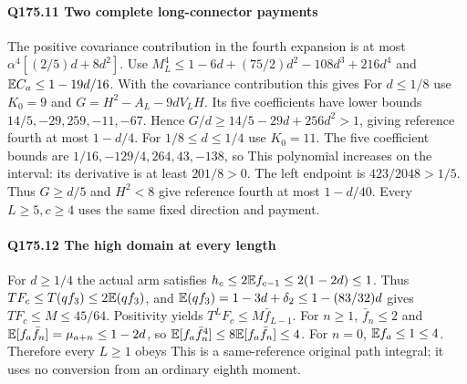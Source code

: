 \paragraph{Q175.11 Two complete long-connector payments}\label{part:Q175.11}
The positive covariance contribution in the fourth expansion is at most
$\alpha^4[(2/5)d+8d^2]$.
Use $M_L^4\le\allowbreak 1-6d+(75/2)d^2-108d^3+216d^4$ and
$\mathbb E C_a\le\allowbreak 1-19d/16$. With the covariance contribution this gives
For $d\le\allowbreak 1/8$ use $K_0=\allowbreak 9$ and $G=\allowbreak H^2-A_L-9dV_LH$.
Its five coefficients have lower bounds $14/5,\allowbreak -29,\allowbreak 259,\allowbreak -11,\allowbreak -67$.
Hence $G/d\ge\allowbreak 14/5-29d+256d^2>\allowbreak 1$, giving reference fourth
at most $1-d/4$.
For $1/8\le\allowbreak  d\le\allowbreak 1/4$ use $K_0=\allowbreak 11$.
The five coefficient bounds are $1/16,\allowbreak -129/4,\allowbreak 264,\allowbreak 43,\allowbreak -138$, so
This polynomial increases on the interval: its derivative is at least
$201/8>\allowbreak 0$. The left endpoint is $423/2048>\allowbreak 1/5$.
Thus $G\ge\allowbreak  d/5$ and $H^2<\allowbreak 8$ give reference fourth at most $1-d/40$.
Every $L\ge\allowbreak 5,\allowbreak c\ge\allowbreak 4$ uses the same fixed direction and payment.

\paragraph{Q175.12 The high domain at every length}\label{part:Q175.12}
For $d\ge\allowbreak 1/4$ the actual arm satisfies
$h_c\le\allowbreak 2\mathbb E f_{c-1}\le\allowbreak 2(1-2d)\le\allowbreak 1$.
Thus $TF_c\le\allowbreak  T(qf_3)\le\allowbreak 2\mathbb E(qf_3)$, and
$\mathbb E(qf_3)=\allowbreak 1-3d+\delta_2\le\allowbreak 1-(83/32)d$ gives $TF_c\le\allowbreak  M\le\allowbreak 45/64$.
Positivity yields $T^LF_c\le\allowbreak  M\bar f_{L-1}$.
For $n\ge\allowbreak 1$, $\bar f_n\le\allowbreak 2$ and
$\mathbb E[f_a\bar f_n]=\allowbreak \mu_{a+n}\le\allowbreak 1-2d$, so
$\mathbb E[f_a\bar f_n^4]\le\allowbreak 8\mathbb E[f_a\bar f_n]\le\allowbreak 4$.
For $n=\allowbreak 0$, $\mathbb E f_a\le\allowbreak 1\le\allowbreak 4$. Therefore every $L\ge\allowbreak 1$ obeys
This is a same-reference original path integral; it uses no conversion
from an ordinary eighth moment.

